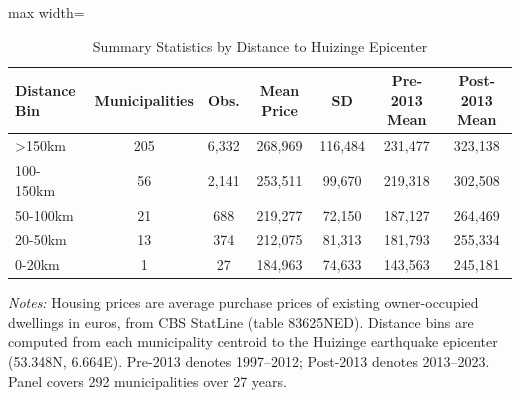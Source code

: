\begin{table}[htbp]
\centering
\begin{threeparttable}
\caption{Summary Statistics by Distance to Huizinge Epicenter}
\label{tab:sumstats}
\begin{adjustbox}{max width=\textwidth}
\begin{tabular}{lcccccc}
\toprule
Distance Bin & Municipalities & Obs. & Mean Price & SD & Pre-2013 Mean & Post-2013 Mean \\
\midrule
>150km & 205 & 6,332 & 268,969 & 116,484 & 231,477 & 323,138 \\
100-150km & 56 & 2,141 & 253,511 & 99,670 & 219,318 & 302,508 \\
50-100km & 21 & 688 & 219,277 & 72,150 & 187,127 & 264,469 \\
20-50km & 13 & 374 & 212,075 & 81,313 & 181,793 & 255,334 \\
0-20km & 1 & 27 & 184,963 & 74,633 & 143,563 & 245,181 \\
\bottomrule
\end{tabular}
\end{adjustbox}
\begin{tablenotes}[flushleft]
\small
\item \textit{Notes:} Housing prices are average purchase prices of existing owner-occupied dwellings in euros, from CBS StatLine (table 83625NED). Distance bins are computed from each municipality centroid to the Huizinge earthquake epicenter (53.348\textdegree N, 6.664\textdegree E). Pre-2013 denotes 1997--2012; Post-2013 denotes 2013--2023. Panel covers 292 municipalities over 27 years.
\end{tablenotes}
\end{threeparttable}
\end{table}
